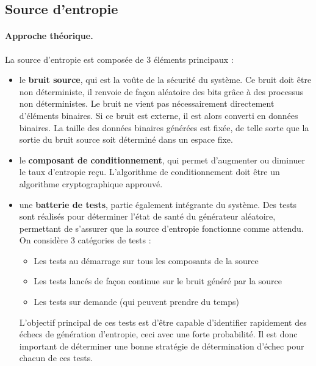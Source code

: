 \subsection{Source d'entropie}
\paragraph{Approche théorique.\\}
La source d'entropie est composée de 3 éléments principaux : 
\begin{itemize}
\item le \textbf{bruit source}, qui est la voûte de la sécurité du système. Ce bruit doit être non déterministe, il renvoie de façon aléatoire des bits grâce à des processus non déterministes. Le bruit ne vient pas nécessairement directement d'éléments binaires. Si ce bruit est externe, il est alors converti en données binaires. La taille des données binaires générées est fixée, de telle sorte que la sortie du bruit source soit déterminé dans un espace fixe.
\item le \textbf{composant de conditionnement}, qui permet d'augmenter ou diminuer le taux d'entropie reçu. L'algorithme de conditionnement doit être un algorithme cryptographique approuvé.
\item une \textbf{batterie de tests}, partie également intégrante du système. Des tests sont réalisés pour déterminer l'état de santé du générateur aléatoire, permettant de s'assurer que la source d'entropie fonctionne comme attendu. On considère 3 catégories de tests : 
	\begin{itemize}
	\item Les tests au démarrage sur tous les composants de la source
	\item Les tests lancés de façon continue sur le bruit généré par la source
	\item Les tests sur demande (qui peuvent prendre du temps)
	\end{itemize}
	L'objectif principal de ces tests est d'être capable d'identifier rapidement des échecs de génération d'entropie, ceci avec une forte probabilité. Il est donc important de déterminer une bonne stratégie de détermination d'échec pour chacun de ces tests.\\
\end{itemize}


